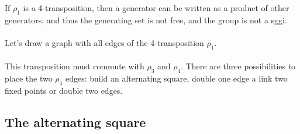 \begin{theorem}
  If $\rho_1$ is a 4-transposition, then a generator can be written as a product of other generators, and thus the generating set is not free, and the group is not a sggi.
\end{theorem}

\paragraph{}
Let's draw a graph with all edges of the 4-transposition $\rho_1$.

\begin{figure}[H]
  \begin{center}
    \caption{}
  \end{center}
\end{figure}

\paragraph{}
This transposition must commute with $\rho_3$ and $\rho_4$. There are three possibilities to place the two $\rho_4$ edges: build an alternating square, double one edge a link two fixed points or double two edges.

\subsection{The alternating square}

